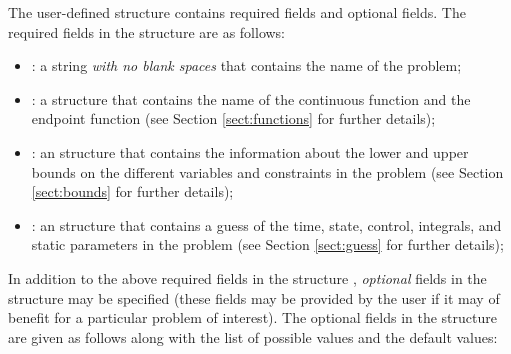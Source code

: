 \documentclass[10pt]{article}
\newcommand{\bfblue}[1]{\textrm{{\color{blue}{\bf #1}}}}
\newcommand{\slred}[1]{\textrm{\color{red}{\sl #1}}}
\begin{document}
The user-defined structure \slred{setup} contains required fields and
optional fields.  The required fields in the structure \slred{input}
are as follows: 
\begin{itemize}
\item \bfblue{name}:  a string {\em with no blank spaces} that
 contains the name of the problem;  
\item \bfblue{functions}:  a structure that contains the name of the
  continuous function and the endpoint function (see Section
  \ref{sect:functions} for further details); 
\item \bfblue{bounds}:  an structure that contains the information
  about the lower and upper bounds on the different variables and 
  constraints in the problem (see Section \ref{sect:bounds} for further
  details); 
\item \bfblue{guess}:  an structure that contains a guess of the
  time, state, control, integrals, and static parameters in the
  problem (see Section \ref{sect:guess} for further details); 
\end{itemize}
In addition to the above required fields in the structure
\slred{setup}, {\em optional} fields in the \slred{setup} structure
may be specified (these fields may be provided by the user if it may
of benefit for a particular problem of interest). The optional fields
in the structure \slred{setup} are given as follows along with the
list of possible values and the default values:
\end{document}
